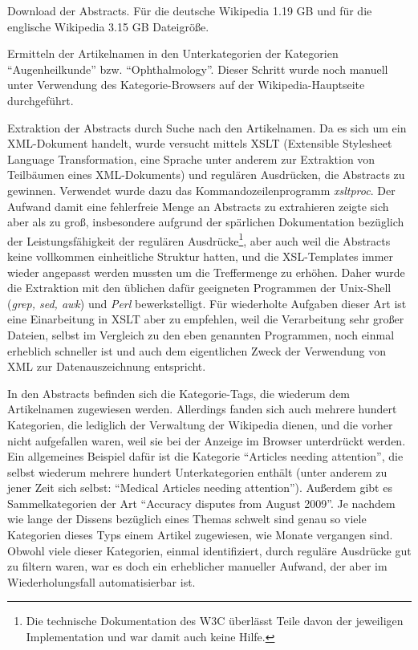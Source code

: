 \documentclass[pagesize,DIV=calc,12pt,final]{scrreprt}
\begin{document}
\begin{inparaenum}
\item Download der Abstracts. Für die deutsche Wikipedia 1.19 GB und für die englische Wikipedia 3.15 GB Dateigröße.

\item Ermitteln der Artikelnamen in den Unterkategorien der Kategorien \enquote{Augenheilkunde} bzw. \enquote{Ophthalmology}. 
Dieser Schritt wurde noch manuell unter Verwendung des Kategorie-Browsers auf der Wikipedia-Hauptseite durchgeführt. 

\item Extraktion der Abstracts durch Suche nach den Artikelnamen. 
Da es sich um ein XML-Dokument handelt, wurde versucht mittels XSLT (Extensible Stylesheet Language Transformation, eine Sprache unter anderem zur Extraktion von Teilbäumen eines XML-Dokuments) und regulären Ausdrücken, die Abstracts zu gewinnen. 
Verwendet wurde dazu das Kommandozeilenprogramm \emph{xsltproc}. 
Der Aufwand damit eine fehlerfreie Menge an Abstracts zu extrahieren zeigte sich aber als zu groß, insbesondere aufgrund der spärlichen Dokumentation bezüglich der Leistungsfähigkeit der regulären Ausdrücke\footnote{Die technische Dokumentation des W3C überlässt Teile davon der jeweiligen Implementation und war damit auch keine Hilfe.}, aber auch weil die Abstracts keine vollkommen einheitliche Struktur hatten, und die XSL-Templates immer wieder angepasst werden mussten um die Treffermenge zu erhöhen. 
Daher wurde die Extraktion mit den üblichen dafür geeigneten Programmen der Unix-Shell (\emph{grep, sed, awk}) und \emph{Perl} bewerkstelligt. 
Für wiederholte Aufgaben dieser Art ist eine Einarbeitung in XSLT aber zu empfehlen, weil die Verarbeitung sehr großer Dateien, selbst im Vergleich zu den eben genannten Programmen, noch einmal erheblich schneller ist und auch dem eigentlichen Zweck der Verwendung von XML zur Datenauszeichnung entspricht. 

\item In den Abstracts befinden sich die Kategorie-Tags, die wiederum dem Artikelnamen zugewiesen werden. 
Allerdings fanden sich auch mehrere hundert Kategorien, die lediglich der Verwaltung der Wikipedia dienen, und die vorher nicht aufgefallen waren, weil sie bei der Anzeige im Browser unterdrückt werden. 
Ein allgemeines Beispiel dafür ist die Kategorie \enquote{Articles needing attention}, die selbst wiederum mehrere hundert Unterkategorien enthält (unter anderem zu jener Zeit sich selbst: \enquote{Medical Articles needing attention}). 
Außerdem gibt es Sammelkategorien der Art \enquote{Accuracy disputes from August 2009}. 
Je nachdem wie lange der Dissens bezüglich eines Themas schwelt sind genau so viele Kategorien dieses Typs einem Artikel zugewiesen, wie Monate vergangen sind. 
Obwohl viele dieser Kategorien, einmal identifiziert, durch reguläre Ausdrücke gut zu filtern waren, war es doch ein erheblicher manueller Aufwand, der aber im Wiederholungsfall automatisierbar ist. \end{inparaenum}
\end{document}
